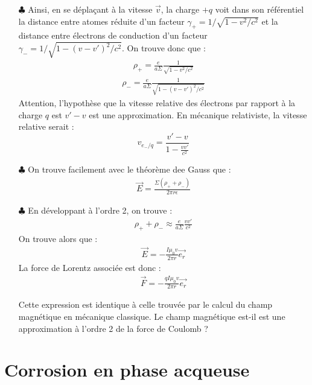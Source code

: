 \documentclass{report}
\begin{document}
	\begin{itemize}
	
		\item[$\clubsuit$] Ainsi, en se déplaçant à la vitesse $\vec{v}$, la charge $+q$ voit dans son référentiel la distance entre atomes réduite d'un facteur $\gamma_{+}=1/\sqrt{1-v^{2}/c^{2}}$ et la distance entre électrons de conduction d'un facteur $\gamma_{-}=1/\sqrt{1-(v-v')^{2}/c^{2}}$. 
		On trouve donc que :
		\begin{align*}
			\rho_+=\frac{e}{a\Sigma}\frac{1}{\sqrt{1-v^{2}/c^{2}}}
		\end{align*}
		\begin{align*}
			\rho_-=\frac{e}{a\Sigma}\frac{1}{\sqrt{1-(v-v')^{2}/c^{2}}}
		\end{align*}		
		Attention, l'hypothèse que la vitesse relative des électrons par rapport à la charge $q$ est $v'-v$ est une approximation. En mécanique relativiste, la vitesse relative serait :
		\begin{equation}
			v_{e_-/q}=\frac{v'-v}{1-\frac{vv'}{c^2}}
		\end{equation}
		
	\item[$\clubsuit$] On trouve facilement avec le théorème dee Gauss que :
	\begin{align*}
		\vec{E}=\frac{\Sigma(\rho_++\rho_-)}{2\pi r\epsilon}
	\end{align*}
	
	\item[$\clubsuit$] En développant à l'ordre 2, on trouve :
	\begin{align*}
		\rho_++\rho_-\approx \frac{e}{a\Sigma}\frac{vv'}{c^2}
	\end{align*}
	On trouve alors que :
	\begin{align*}
		\vec{E}=-\frac{I\mu_0 v}{2\pi r}\vec{e_r}
	\end{align*}
	La force de Lorentz associée est donc :
	\begin{align*}
		\vec{F}=-\frac{qI\mu_0 v}{2\pi r}\vec{e_r}
	\end{align*}
	
	Cette expression est identique à celle trouvée par le calcul du champ magnétique en mécanique classique. Le champ magnétique est-il est une approximation à l'ordre 2 de la force de Coulomb ? 
	\end{itemize}

\section*{Corrosion en phase acqueuse}
\end{document}
